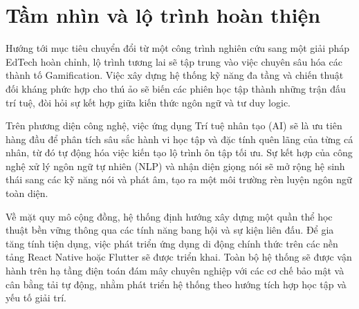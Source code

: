 \section{Tầm nhìn và lộ trình hoàn thiện}

Hướng tới mục tiêu chuyển đổi từ một công trình nghiên cứu sang một giải pháp EdTech hoàn chỉnh, lộ trình tương lai sẽ tập trung vào việc chuyên sâu hóa các thành tố Gamification. Việc xây dựng hệ thống kỹ năng đa tầng và chiến thuật đối kháng phức hợp cho thú ảo sẽ biến các phiên học tập thành những trận đấu trí tuệ, đòi hỏi sự kết hợp giữa kiến thức ngôn ngữ và tư duy logic.

Trên phương diện công nghệ, việc ứng dụng Trí tuệ nhân tạo (AI) sẽ là ưu tiên hàng đầu để phân tích sâu sắc hành vi học tập và đặc tính quên lãng của từng cá nhân, từ đó tự động hóa việc kiến tạo lộ trình ôn tập tối ưu. Sự kết hợp của công nghệ xử lý ngôn ngữ tự nhiên (NLP) và nhận diện giọng nói sẽ mở rộng hệ sinh thái sang các kỹ năng nói và phát âm, tạo ra một môi trường rèn luyện ngôn ngữ toàn diện.

Về mặt quy mô cộng đồng, hệ thống định hướng xây dựng một quần thể học thuật bền vững thông qua các tính năng bang hội và sự kiện liên đấu. Để gia tăng tính tiện dụng, việc phát triển ứng dụng di động chính thức trên các nền tảng React Native hoặc Flutter sẽ được triển khai. Toàn bộ hệ thống sẽ được vận hành trên hạ tầng điện toán đám mây chuyên nghiệp với các cơ chế bảo mật và cân bằng tải tự động, nhằm phát triển hệ thống theo hướng tích hợp học tập và yếu tố giải trí.